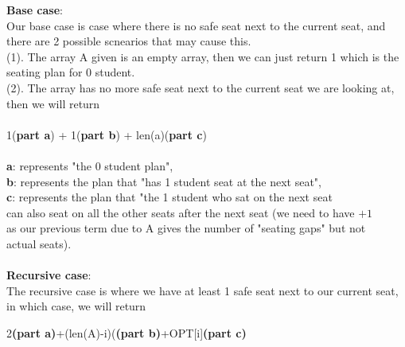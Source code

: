 \documentclass{assignment-373}
\begin{document}
\begin{enumerate}
\begin{enumerate}
{\bf Base case}:\\
\phantom{=} \phantom{=} Our base case is case where there is no safe seat next to the current seat, and there are 2 possible scnearios that may cause this.\\
\phantom{=} \phantom{=} \phantom{=} \phantom{=} (1). The array A given is an empty array, then we can just return 1 which is the seating plan for 0 student.\\
\phantom{=} \phantom{=} \phantom{=} \phantom{=} (2). The array has no more safe seat next to the current seat we are looking at, then we will return \\
\\
\phantom{=} \phantom{=} \phantom{=} \phantom{=} \phantom{=} \phantom{=} \phantom{=} \phantom{=} \phantom{=} 1({\bf part a}) + 1({\bf part b}) + len(a)({\bf part c})\\
\\
\phantom{=} \phantom{=} \phantom{=} \phantom{=} {\bf a}: represents "the 0 student plan",\\
\phantom{=} \phantom{=} \phantom{=} \phantom{=} {\bf b}: represents the plan that "has 1 student seat at the next seat",\\ 
\phantom{=} \phantom{=} \phantom{=} \phantom{=} {\bf c}: represents the plan that "the 1 student who sat on the next seat \\
\phantom{=} \phantom{=} \phantom{=} \phantom{=} can also seat on all the other seats after the next seat (we need to have $+1$ \\
\phantom{=} \phantom{=} \phantom{=} \phantom{=} as our previous term  due to A gives the number of "seating gaps" but not\\
\phantom{=} \phantom{=} \phantom{=} \phantom{=} actual seats).\\
\\
{\bf Recursive case}:\\
\phantom{=} \phantom{=}  The recursive case is where we have at least 1 safe seat next to our current seat, in which case, we will return\\
\begin{center}
    2{\bf (part a)}+(len(A)-i)({\bf (part b)}+OPT[i]{\bf (part c)}
\end{center}


\end{enumerate}
\end{enumerate}
\end{document}
